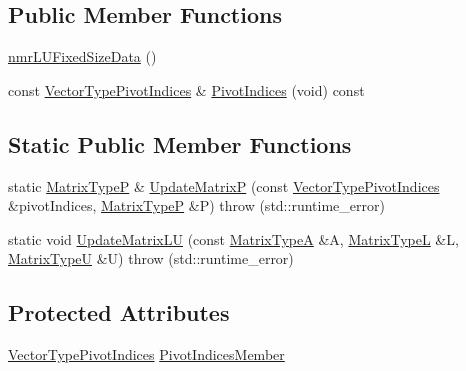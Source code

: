 \subsection*{Public Member Functions}
\begin{DoxyCompactItemize}
\item 
\hyperlink{classnmr_l_u_fixed_size_data_a53d700280dd2663d45686bfae5fa0867}{nmr\+L\+U\+Fixed\+Size\+Data} ()
\item 
const \hyperlink{classnmr_l_u_fixed_size_data_aa44bd56146e161d7b56d7f2001153ccb}{Vector\+Type\+Pivot\+Indices} \& \hyperlink{classnmr_l_u_fixed_size_data_a450ee8a4007ec135b10d3885252f10ad}{Pivot\+Indices} (void) const 
\end{DoxyCompactItemize}
\subsection*{Static Public Member Functions}
\begin{DoxyCompactItemize}
\item 
static \hyperlink{classnmr_l_u_fixed_size_data_aba187a86e2a881d8327e56bdbc87b159}{Matrix\+Type\+P} \& \hyperlink{classnmr_l_u_fixed_size_data_a5d947401ed17aa37b22c32b21635351f}{Update\+Matrix\+P} (const \hyperlink{classnmr_l_u_fixed_size_data_aa44bd56146e161d7b56d7f2001153ccb}{Vector\+Type\+Pivot\+Indices} \&pivot\+Indices, \hyperlink{classnmr_l_u_fixed_size_data_aba187a86e2a881d8327e56bdbc87b159}{Matrix\+Type\+P} \&P)  throw (std\+::runtime\+\_\+error)
\item 
static void \hyperlink{classnmr_l_u_fixed_size_data_a3f656dde277e1d9841a9a21270e13861}{Update\+Matrix\+L\+U} (const \hyperlink{classnmr_l_u_fixed_size_data_aecd74a0eb81f7dae537d4cce15781210}{Matrix\+Type\+A} \&A, \hyperlink{classnmr_l_u_fixed_size_data_a6bf3bc7a9257ec14a9a47f6144fdbb4c}{Matrix\+Type\+L} \&L, \hyperlink{classnmr_l_u_fixed_size_data_af66a67d9ec3e76d9d63dc36cfd969896}{Matrix\+Type\+U} \&U)  throw (std\+::runtime\+\_\+error)
\end{DoxyCompactItemize}
\subsection*{Protected Attributes}
\begin{DoxyCompactItemize}
\item 
\hyperlink{classnmr_l_u_fixed_size_data_aa44bd56146e161d7b56d7f2001153ccb}{Vector\+Type\+Pivot\+Indices} \hyperlink{classnmr_l_u_fixed_size_data_afcd875504a4471fe5f0997ca8de617ad}{Pivot\+Indices\+Member}
\end{DoxyCompactItemize}

